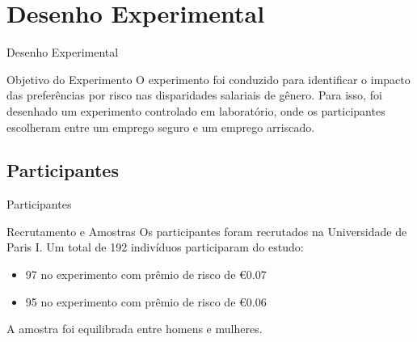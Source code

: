 \documentclass[aspectratio=169, xcolor={dvipsnames}, 10pt, brazil]{beamer}
\begin{document}
\section{Desenho Experimental}
\begin{frame}{Desenho Experimental}

    \begin{block}{Objetivo do Experimento}
        O experimento foi conduzido para identificar o impacto das preferências por risco nas disparidades salariais de gênero. Para isso, foi desenhado um experimento controlado em laboratório, onde os participantes escolheram entre um emprego seguro e um emprego arriscado.
    \end{block}

\end{frame}

\subsection{Participantes}
\begin{frame}{Participantes}

    \begin{block}{Recrutamento e Amostras}
        Os participantes foram recrutados na Universidade de Paris I. Um total de 192 indivíduos participaram do estudo:
        \begin{itemize}
            \item 97 no experimento com prêmio de risco de €0.07
            \item 95 no experimento com prêmio de risco de €0.06
        \end{itemize}
        A amostra foi equilibrada entre homens e mulheres.
    \end{block}

\end{frame}

\end{document}
